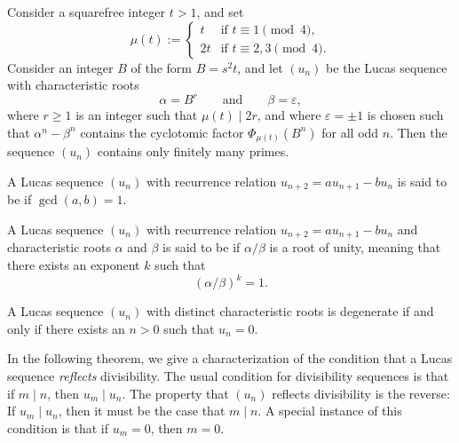 \begin{theorem}
  Consider a squarefree integer $t>1$, and set
  \begin{equation*}
    \mu(t) :=
    \begin{cases}
      t & \text{if $t\equiv 1\pmod{4}$,} \\
      2t & \text{if $t\equiv 2,3\pmod{4}$.}
    \end{cases}
  \end{equation*}
  Consider an integer $B$ of the form $B=s^2t$, and let $(u_n)$ be the Lucas sequence with characteristic roots
  \begin{equation*}
    \alpha = B^r\qquad\text{and}\qquad \beta=\varepsilon,
  \end{equation*}
  where $r\geq 1$ is an integer such that $\mu(t)\mid 2r$, and where $\varepsilon=\pm 1$ is chosen such that $\alpha^n-\beta^n$ contains the cyclotomic factor $\Phi_{\mu(t)}(B^n)$ for all odd $n$. Then the sequence $(u_n)$ contains only finitely many primes.
\end{theorem}

\begin{definition}
  A Lucas sequence $(u_n)$ with recurrence relation $u_{n+2}=au_{n+1}-bu_n$ is said to be  if $\gcd(a,b)=1$.
\end{definition}

\begin{definition}
  A Lucas sequence $(u_n)$ with recurrence relation $u_{n+2}=au_{n+1}-bu_n$ and characteristic roots $\alpha$ and $\beta$ is said to be  if $\alpha/\beta$ is a root of unity, meaning that there exists an exponent $k$ such that
  \begin{equation*}
    (\alpha/\beta)^k=1.
  \end{equation*}
\end{definition}

\begin{theorem}
  A Lucas sequence $(u_n)$ with distinct characteristic roots is degenerate if and only if there exists an $n>0$ such that $u_n=0$.
\end{theorem}

In the following theorem, we give a characterization of the condition that a Lucas sequence \emph{reflects} divisibility. The usual condition for divisibility sequences is that if $m\mid n$, then $u_m\mid u_n$. The property that $(u_n)$ reflects divisibility is the reverse: If $u_m\mid u_n$, then it must be the case that $m\mid n$. A special instance of this condition is that if $u_m=0$, then $m=0$.

